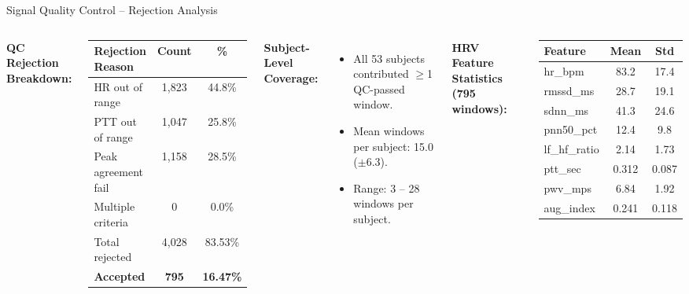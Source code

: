 \documentclass[aspectratio=169]{beamer}
\begin{document}
\begin{frame}{Signal Quality Control -- Rejection Analysis}
  \begin{columns}[T]
      \textbf{QC Rejection Breakdown:}
      \begin{center}\small
      \begin{tabular}{@{}lcc@{}}
        \toprule
        \textbf{Rejection Reason} & \textbf{Count} & \textbf{\%} \\
        \midrule
        HR out of range           & 1,823 & 44.8\% \\
        PTT out of range          & 1,047 & 25.8\% \\
        Peak agreement fail       & 1,158 & 28.5\% \\
        Multiple criteria         & 0     &  0.0\% \\
        \midrule
        Total rejected            & 4,028 & 83.53\% \\
        \textbf{Accepted}         & \textbf{795} & \textbf{16.47\%} \\
        \bottomrule
      \end{tabular}
      \end{center}
      \vspace{0.3em}
      \textbf{Subject-Level Coverage:}
      \begin{itemize}\small
        \item All 53 subjects contributed $\geq$1 QC-passed window.
        \item Mean windows per subject: 15.0 ($\pm$6.3).
        \item Range: 3 -- 28 windows per subject.
      \end{itemize}
      \textbf{HRV Feature Statistics (795 windows):}
      \begin{center}\small
      \begin{tabular}{@{}lcc@{}}
        \toprule
        \textbf{Feature} & \textbf{Mean} & \textbf{Std} \\
        \midrule
        hr\_bpm      & 83.2  & 17.4 \\
        rmssd\_ms    & 28.7  & 19.1 \\
        sdnn\_ms     & 41.3  & 24.6 \\
        pnn50\_pct   & 12.4  &  9.8 \\
        lf\_hf\_ratio & 2.14 &  1.73 \\
        ptt\_sec     & 0.312 & 0.087 \\
        pwv\_mps     & 6.84  & 1.92 \\
        aug\_index   & 0.241 & 0.118 \\
        \bottomrule
      \end{tabular}
      \end{center}
  \end{columns}
\end{frame}
\end{document}
